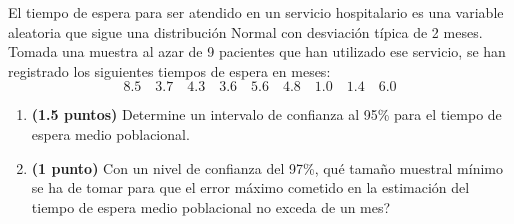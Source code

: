 
El tiempo de espera para ser atendido en un servicio hospitalario es una
variable aleatoria que sigue una distribución Normal con desviación típica
de 2 meses. Tomada una muestra al azar de 9 pacientes que han utilizado ese
servicio, se han registrado los siguientes tiempos de espera en meses:
\[
8.5\quad 3.7\quad 4.3\quad 3.6\quad 5.6\quad 4.8\quad 1.0\quad
1.4\quad 6.0
\]
\begin{enumerate}[label=\alph*)]
  \item \textbf{(1.5 puntos)} Determine un intervalo de confianza al 95\%
  para el tiempo de espera medio poblacional.
  \item \textbf{(1 punto)} Con un nivel de confianza del 97\%,
  \textquestiondown{}qué tamaño muestral mínimo se ha de tomar para que
  el error máximo cometido en la estimación del tiempo de espera medio
  poblacional no exceda de un mes?
\end{enumerate}
